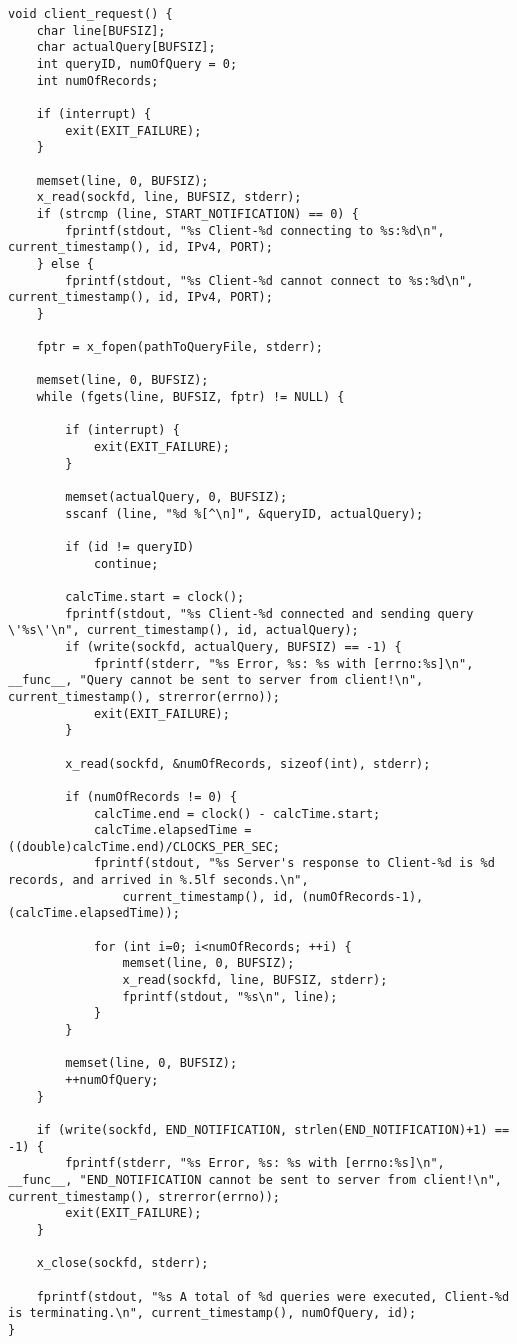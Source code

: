 \documentclass{article}
\begin{document}
\begin{lstlisting}[style=CStyle]
void client_request() {
    char line[BUFSIZ];
    char actualQuery[BUFSIZ];
    int queryID, numOfQuery = 0;
    int numOfRecords;
    
    if (interrupt) {
        exit(EXIT_FAILURE);
    }

    memset(line, 0, BUFSIZ);
    x_read(sockfd, line, BUFSIZ, stderr);
    if (strcmp (line, START_NOTIFICATION) == 0) {
        fprintf(stdout, "%s Client-%d connecting to %s:%d\n", current_timestamp(), id, IPv4, PORT);
    } else {
        fprintf(stdout, "%s Client-%d cannot connect to %s:%d\n", current_timestamp(), id, IPv4, PORT);
    }

    fptr = x_fopen(pathToQueryFile, stderr);

    memset(line, 0, BUFSIZ);
    while (fgets(line, BUFSIZ, fptr) != NULL) {

        if (interrupt) {
            exit(EXIT_FAILURE);
        }
        
        memset(actualQuery, 0, BUFSIZ);
        sscanf (line, "%d %[^\n]", &queryID, actualQuery);

        if (id != queryID)
            continue;
        
        calcTime.start = clock();
        fprintf(stdout, "%s Client-%d connected and sending query \'%s\'\n", current_timestamp(), id, actualQuery);
        if (write(sockfd, actualQuery, BUFSIZ) == -1) {
            fprintf(stderr, "%s Error, %s: %s with [errno:%s]\n", __func__, "Query cannot be sent to server from client!\n", current_timestamp(), strerror(errno));
            exit(EXIT_FAILURE);
        }
        
        x_read(sockfd, &numOfRecords, sizeof(int), stderr);

        if (numOfRecords != 0) {
            calcTime.end = clock() - calcTime.start;
            calcTime.elapsedTime = ((double)calcTime.end)/CLOCKS_PER_SEC;
            fprintf(stdout, "%s Server's response to Client-%d is %d records, and arrived in %.5lf seconds.\n",
                current_timestamp(), id, (numOfRecords-1), (calcTime.elapsedTime));

            for (int i=0; i<numOfRecords; ++i) {
                memset(line, 0, BUFSIZ);
                x_read(sockfd, line, BUFSIZ, stderr);
                fprintf(stdout, "%s\n", line);
            }
        }
        
        memset(line, 0, BUFSIZ);
        ++numOfQuery;
    }

    if (write(sockfd, END_NOTIFICATION, strlen(END_NOTIFICATION)+1) == -1) {
        fprintf(stderr, "%s Error, %s: %s with [errno:%s]\n", __func__, "END_NOTIFICATION cannot be sent to server from client!\n", current_timestamp(), strerror(errno));
        exit(EXIT_FAILURE);
    }

    x_close(sockfd, stderr);

    fprintf(stdout, "%s A total of %d queries were executed, Client-%d is terminating.\n", current_timestamp(), numOfQuery, id);
}
\end{lstlisting}
\end{document}
